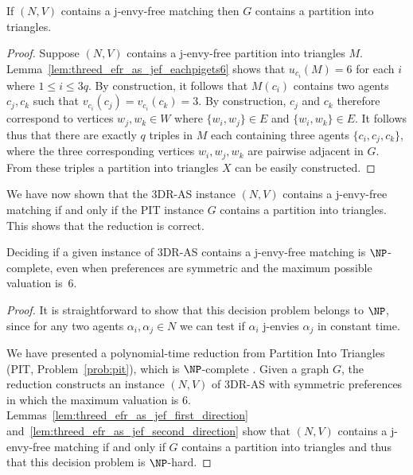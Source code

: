 \begin{lem}
\label{lem:threed_efr_as_jef_second_direction}
If $(N, V)$ contains a j-envy-free matching then $G$ contains a partition into triangles.
\end{lem}
\begin{proof}
Suppose $(N, V)$ contains a j-envy-free partition into triangles $M$. Lemma~\ref{lem:threed_efr_as_jef_eachpigets6} shows that $u_{c_i}(M) = 6$ for each $i$ where $1\leq i \leq 3q$. By construction, it follows that $M(c_i)$ contains two agents $c_j, c_k$ such that $v_{c_i}(c_j) = v_{c_i}(c_k) = 3$. By construction, $c_j$ and $c_k$ therefore correspond to vertices $w_j, w_k \in W$ where $\{ w_i, w_j \} \in E$ and $\{ w_i, w_k \} \in E$. It follows thus that there are exactly $q$ triples in $M$ each containing three agents $\{ c_i, c_j, c_k \}$, where the three corresponding vertices $w_i, w_j, w_k$ are pairwise adjacent in $G$. From these triples a partition into triangles $X$ can be easily constructed.
\end{proof}


We have now shown that the 3DR-AS instance $(N, V)$ contains a j-envy-free matching if and only if the PIT instance $G$ contains a partition into triangles. This shows that the reduction is correct.

\begin{thm}
\label{thm:threed_efr_as_jef_symmetric_6_npcomplete}
Deciding if a given instance of 3DR-AS contains a j-envy-free matching is $\NP$-complete, even when preferences are symmetric and the maximum possible valuation is~$6$.
\end{thm}
\begin{proof}
It is straightforward to show that this decision problem belongs to $\NP$, since for any two agents $\alpha_i, \alpha_j \in N$ we can test if $\alpha_i$ j-envies $\alpha_j$ in constant time. 

We have presented a polynomial-time reduction from Partition Into Triangles (PIT, Problem~\ref{prob:pit}), which is $\NP$-complete \cite{GJ79}. Given a graph $G$, the reduction constructs an instance $(N, V)$ of 3DR-AS with symmetric preferences in which the maximum valuation is $6$. Lemmas~\ref{lem:threed_efr_as_jef_first_direction} and~\ref{lem:threed_efr_as_jef_second_direction} show that $(N, V)$ contains a j-envy-free matching if and only if $G$ contains a partition into triangles and thus that this decision problem is $\NP$-hard.
\end{proof}